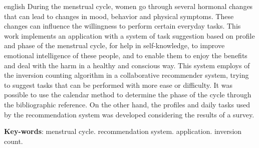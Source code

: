\begin{resumo}[Abstract]
  \begin{otherlanguage*}{english}
    During the menstrual cycle, women go through several hormonal changes that
    can lead to
    changes in mood, behavior and physical symptoms. These changes can influence the
    willingness to perform certain everyday tasks. This work implements an application 
    with a system of
    task suggestion based on
    profile and phase of the menstrual cycle, 
    for help in self-knowledge, to improve emotional intelligence
    of these people, and to enable them to enjoy the benefits and deal with the
    harm
    in a healthy and conscious way. This system employs of the inversion counting algorithm
    in a collaborative recommender system, trying to suggest tasks
    that can be performed with more ease or difficulty. 
    It was possible to use the calendar method to determine the phase of the cycle through 
    the bibliographic reference. On the other 
    hand, the profiles and daily tasks used by the recommendation system 
    was developed considering the results of a survey.
    \vspace{\onelineskip}
  
    \noindent 
    \textbf{Key-words}: 
    menstrual cycle. recommendation system. application. inversion count.
  \end{otherlanguage*}
 \end{resumo}
 
